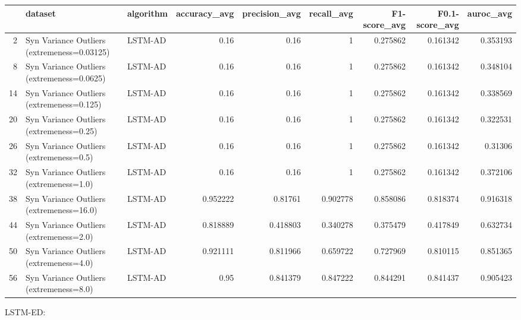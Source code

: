 \begin{tabular}{rllrrrrrr}
\hline
    & dataset                                     & algorithm   &   accuracy\_avg &   precision\_avg &   recall\_avg &   F1-score\_avg &   F0.1-score\_avg &   auroc\_avg \\
\hline
  2 & Syn Variance Outliers (extremeness=0.03125) & LSTM-AD     &       0.16     &        0.16     &     1        &       0.275862 &         0.161342 &    0.353193 \\
  8 & Syn Variance Outliers (extremeness=0.0625)  & LSTM-AD     &       0.16     &        0.16     &     1        &       0.275862 &         0.161342 &    0.348104 \\
 14 & Syn Variance Outliers (extremeness=0.125)   & LSTM-AD     &       0.16     &        0.16     &     1        &       0.275862 &         0.161342 &    0.338569 \\
 20 & Syn Variance Outliers (extremeness=0.25)    & LSTM-AD     &       0.16     &        0.16     &     1        &       0.275862 &         0.161342 &    0.322531 \\
 26 & Syn Variance Outliers (extremeness=0.5)     & LSTM-AD     &       0.16     &        0.16     &     1        &       0.275862 &         0.161342 &    0.31306  \\
 32 & Syn Variance Outliers (extremeness=1.0)     & LSTM-AD     &       0.16     &        0.16     &     1        &       0.275862 &         0.161342 &    0.372106 \\
 38 & Syn Variance Outliers (extremeness=16.0)    & LSTM-AD     &       0.952222 &        0.81761  &     0.902778 &       0.858086 &         0.818374 &    0.916318 \\
 44 & Syn Variance Outliers (extremeness=2.0)     & LSTM-AD     &       0.818889 &        0.418803 &     0.340278 &       0.375479 &         0.417849 &    0.632734 \\
 50 & Syn Variance Outliers (extremeness=4.0)     & LSTM-AD     &       0.921111 &        0.811966 &     0.659722 &       0.727969 &         0.810115 &    0.851365 \\
 56 & Syn Variance Outliers (extremeness=8.0)     & LSTM-AD     &       0.95     &        0.841379 &     0.847222 &       0.844291 &         0.841437 &    0.905423 \\
\hline
\end{tabular}

LSTM-ED:

